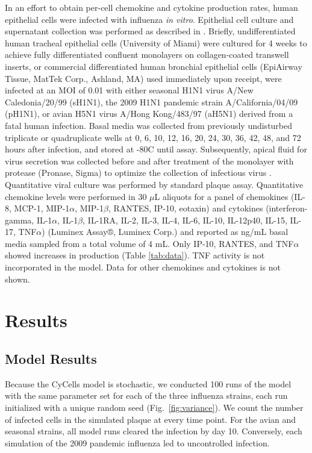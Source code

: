 \documentclass[preprint,10pt,numbers]{elsarticle}
\begin{document}
In an effort to obtain per-cell chemokine and cytokine production rates, human epithelial cells were infected with influenza \textit{in vitro}.  Epithelial cell culture and supernatant collection was performed as described in \citep{Mitchell2011}.  Briefly, undifferentiated human tracheal epithelial cells (University of Miami) were cultured for 4 weeks to achieve fully differentiated confluent monolayers on collagen-coated transwell inserts, or commercial differentiated human bronchial epithelial cells (EpiAirway Tissue, MatTek Corp., Ashland, MA) used immediately upon receipt, were infected at an MOI of 0.01 with either seasonal H1N1 virus A/New Caledonia/20/99 (sH1N1), the 2009 H1N1 pandemic strain A/California/04/09 (pH1N1), or avian H5N1 virus A/Hong Kong/483/97 (aH5N1) derived from a fatal human infection.  Basal media was collected from previously undisturbed triplicate or quadruplicate wells at 0, 6, 10, 12, 16, 20, 24, 30, 36, 42, 48, and 72 hours after infection, and stored at -80C until assay.  Subsequently, apical fluid for virus secretion was collected before and after treatment of the monolayer with protease (Pronase, Sigma) to optimize the collection of infectious virus \citep{Mitchell2011}.  Quantitative viral culture was performed by standard plaque assay.  Quantitative chemokine levels were performed in 30 $\mu$L aliquots for a panel of chemokines (IL-8, MCP-1, MIP-1$\alpha$, MIP-1$\beta$, RANTES, IP-10, eotaxin) and cytokines (interferon-gamma, IL-1$\alpha$, IL-1$\beta$, IL-1RA, IL-2, IL-3, IL-4, IL-6, IL-10, IL-12p40, IL-15, IL-17, TNF$\alpha$) (Luminex Assay®, Luminex Corp.) and reported as ng/mL basal media sampled from a total volume of 4 mL.  Only IP-10, RANTES, and TNF$\alpha$ showed increases in production (Table \ref{tab:data}).  TNF activity is not incorporated in the model.  Data for other chemokines and cytokines is not shown.



\section*{Results}

\subsection*{Model Results}

Because the CyCells model is stochastic, we conducted 100 runs of the model with the same parameter set for each of the three influenza strains, each run initialized with a unique random seed (Fig.~\ref{fig:variance}).  We count the number of infected cells in the simulated plaque at every time point.  For the avian and seasonal strains, all model runs cleared the infection by day 10.  Conversely, each simulation of the 2009 pandemic influenza led to uncontrolled infection. 
\end{document}
